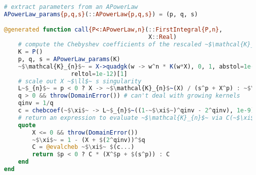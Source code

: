 \begin{singlespace}
\begin{lstlisting}[language=julia]
# extract parameters from an APowerLaw
APowerLaw_params{p,q,s}(::APowerLaw{p,q,s}) = (p, q, s)

@generated function call{P<:APowerLaw,n}(::FirstIntegral{P,n},
                                         X::Real)
    # compute the Chebyshev coefficients of the rescaled ~$\mathcal{K}_{n}$~
    K = P()
    p, q, s = APowerLaw_params(K)
    ~$\mathcal{K}_{n}$~ = X->quadgk(w -> w^n * K(w*X), 0, 1, abstol=1e-14,
                   reltol=1e-12)[1]
    # scale out X ~$\ll$~ s singularity
    L~$_{n}$~ = p < 0 ? X -> ~$\mathcal{K}_{n}$~(X) / (s^p + X^p) : ~$\mathcal{K}_{n}$~
    q > 0 && throw(DomainError()) # can't deal with growing kernels
    qinv = 1/q
    c = chebcoef(~$\xi$~ -> L~$_{n}$~((1-~$\xi$~)^qinv - 2^qinv), 1e-9)
    # return an expression to evaluate ~$\mathcal{K}_{n}$~ via C(~$\xi$~)
    quote
        X <= 0 && throw(DomainError())
        ~$\xi$~ = 1 - (X + $(2^qinv))^$q
        C = @evalcheb ~$\xi$~ $(c...)
        return $p < 0 ? C * (X^$p + $(s^p)) : C
    end
end

\end{lstlisting}
\end{singlespace}
